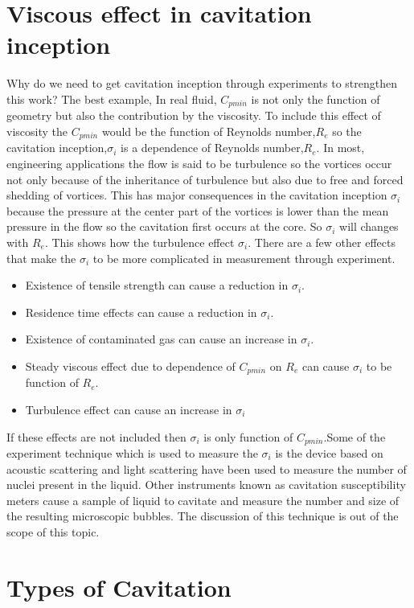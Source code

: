   \section{Viscous effect in cavitation inception}
  Why do we need to get cavitation inception through experiments to strengthen this work?
  The best example, In real fluid, $C_{pmin}$ is not only the function of geometry but also the contribution by the viscosity. To include this effect of viscosity the $C_{pmin}$ would be the function of 
  Reynolds number,$R_e$ so the cavitation inception,${\sigma}_i$ is a dependence of Reynolds number,$R_e$. In most, engineering applications the flow is said to be turbulence so the vortices occur not only 
  because of the inheritance of turbulence but also due to free and forced shedding of vortices. This has major consequences in the cavitation inception ${\sigma}_i$ because the pressure at the center part of the 
  vortices is lower than the mean pressure in the flow so the cavitation first occurs at the core. So ${\sigma}_i$ will changes with $R_e$. This shows how the turbulence effect ${\sigma}_i$. There are a few other effects that 
  make the ${\sigma}_i$ to be more complicated in measurement through experiment.
  \begin{itemize}
  \item Existence of tensile strength can cause a reduction in ${\sigma}_i$.
  \item Residence time effects can cause a reduction in ${\sigma}_i$.
  \item Existence of contaminated gas can cause an increase in ${\sigma}_i$.
  \item Steady viscous effect due to dependence of $C_{pmin}$ on $R_e$ can cause ${\sigma}_i$ to be function of $R_e$.
  \item Turbulence effect can cause an increase in ${\sigma}_i$
  \end{itemize}
  If these effects are not included then ${\sigma}_i$ is only function of $C_{pmin}$.Some of the experiment technique which is used to measure the ${\sigma}_i$ is the device based on acoustic scattering and light
  scattering have been used to measure the number of nuclei present in the liquid. Other instruments known as cavitation susceptibility meters cause a sample of liquid to cavitate and measure the number and size of the 
  resulting microscopic bubbles. The discussion of this technique is out of the scope of this topic.
  \section{Types of Cavitation}
